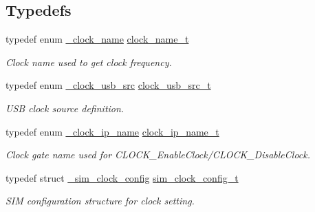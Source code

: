 \subsection*{Typedefs}
\begin{DoxyCompactItemize}
\item 
\mbox{\label{group__clock_gacb9ec0a8b3aa569692b550ebdcac7b3c}} 
typedef enum \mbox{\hyperlink{group__clock_ga10eb499a97d1bd20020841220bb5de74}{\+\_\+clock\+\_\+name}} \mbox{\hyperlink{group__clock_gacb9ec0a8b3aa569692b550ebdcac7b3c}{clock\+\_\+name\+\_\+t}}
\begin{DoxyCompactList}\small\item\em Clock name used to get clock frequency. \end{DoxyCompactList}\item 
\mbox{\label{group__clock_ga014128d824509a661c917ed0ed21149f}} 
typedef enum \mbox{\hyperlink{group__clock_ga9ebbef69e6c5fd52879fa79b3e607cf2}{\+\_\+clock\+\_\+usb\+\_\+src}} \mbox{\hyperlink{group__clock_ga014128d824509a661c917ed0ed21149f}{clock\+\_\+usb\+\_\+src\+\_\+t}}
\begin{DoxyCompactList}\small\item\em U\+SB clock source definition. \end{DoxyCompactList}\item 
\mbox{\label{group__clock_gaf3dd76fcb181c1abd9eff8ddfc4f1c13}} 
typedef enum \mbox{\hyperlink{group__clock_ga0d01cff2c331cdc2703b798930b1c9cd}{\+\_\+clock\+\_\+ip\+\_\+name}} \mbox{\hyperlink{group__clock_gaf3dd76fcb181c1abd9eff8ddfc4f1c13}{clock\+\_\+ip\+\_\+name\+\_\+t}}
\begin{DoxyCompactList}\small\item\em Clock gate name used for C\+L\+O\+C\+K\+\_\+\+Enable\+Clock/\+C\+L\+O\+C\+K\+\_\+\+Disable\+Clock. \end{DoxyCompactList}\item 
\mbox{\label{group__clock_gad8383426c7f9ff4119a0b6c10de5281d}} 
typedef struct \mbox{\hyperlink{struct__sim__clock__config}{\+\_\+sim\+\_\+clock\+\_\+config}} \mbox{\hyperlink{group__clock_gad8383426c7f9ff4119a0b6c10de5281d}{sim\+\_\+clock\+\_\+config\+\_\+t}}
\begin{DoxyCompactList}\small\item\em S\+IM configuration structure for clock setting. \end{DoxyCompactList}\item 

\end{DoxyCompactItemize}
